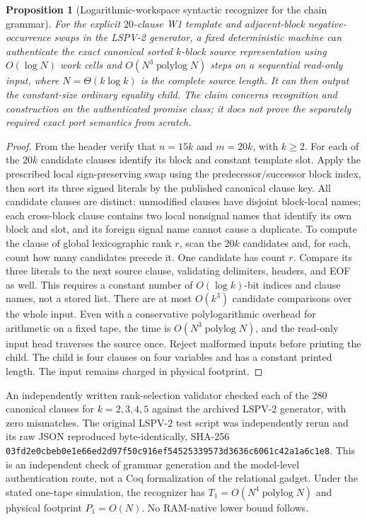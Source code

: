 \documentclass[11pt]{article}
\newtheorem{proposition}[theorem]{Proposition}
\begin{document}
\begin{proposition}[Logarithmic-workspace syntactic recognizer for the chain grammar]
For the explicit $20$-clause W1 template and adjacent-block negative-occurrence swaps in the LSPV-2 generator, a fixed deterministic machine can authenticate the \emph{exact canonical sorted} $k$-block source representation using $O(\log N)$ work cells and $O(N^3\operatorname{polylog}N)$ steps on a sequential read-only input, where $N=\Theta(k\log k)$ is the complete source length. It can then output the constant-size ordinary equality child. The claim concerns recognition and construction on the authenticated promise class; it does not prove the separately required exact port semantics from scratch.
\end{proposition}
\begin{proof}
From the header verify that $n=15k$ and $m=20k$, with $k\ge2$. For each of the $20k$ candidate clauses identify its block and constant template slot. Apply the prescribed local sign-preserving swap using the predecessor/successor block index, then sort its three signed literals by the published canonical clause key. All candidate clauses are distinct: unmodified clauses have disjoint block-local names; each cross-block clause contains two local nonsignal names that identify its own block and slot, and its foreign signal name cannot cause a duplicate. To compute the clause of global lexicographic rank $r$, scan the $20k$ candidates and, for each, count how many candidates precede it. One candidate has count $r$. Compare its three literals to the next source clause, validating delimiters, headers, and EOF as well. This requires a constant number of $O(\log k)$-bit indices and clause names, not a stored list. There are at most $O(k^3)$ candidate comparisons over the whole input. Even with a conservative polylogarithmic overhead for arithmetic on a fixed tape, the time is $O(N^3\operatorname{polylog}N)$, and the read-only input head traverses the source once. Reject malformed inputs before printing the child. The child is four clauses on four variables and has a constant printed length. The input remains charged in physical footprint.
\end{proof}

An independently written rank-selection validator checked each of the 280 canonical clauses for $k=2,3,4,5$ against the archived LSPV-2 generator, with zero mismatches. The original LSPV-2 test script was independently rerun and its raw JSON reproduced byte-identically, SHA-256 \texttt{03fd2e0cbeb0e1e6}\allowbreak\texttt{6ed2d97f50c916ef}\allowbreak\texttt{54525339573d3636}\allowbreak\texttt{c6061c42a1a6c1e8}. This is an independent check of grammar generation and the model-level authentication route, not a Coq formalization of the relational gadget. Under the stated one-tape simulation, the recognizer has $T_1=O(N^4\operatorname{polylog}N)$ and physical footprint $P_1=O(N)$. No RAM-native lower bound follows.
\end{document}
